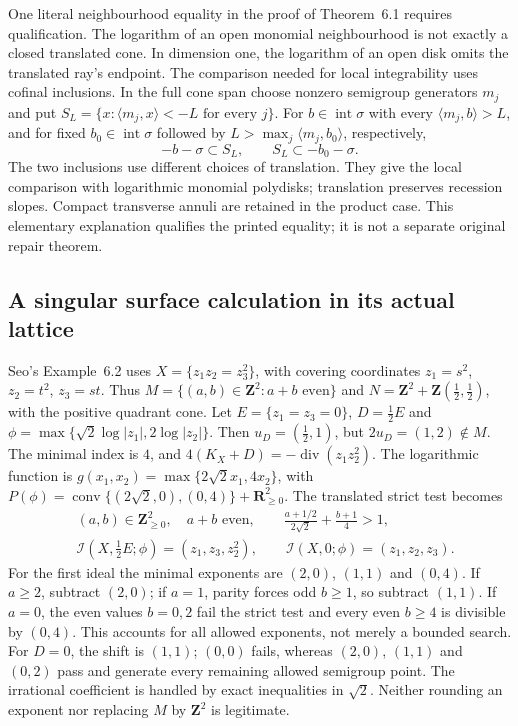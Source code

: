 One literal neighbourhood equality in the proof of Theorem~6.1
requires qualification. The logarithm of an open monomial neighbourhood
is not exactly a closed translated cone. In dimension one, the
logarithm of an open disk omits the translated ray's endpoint.
The comparison needed for local integrability uses cofinal inclusions.
In the full cone span choose nonzero semigroup generators $m_j$ and
put $S_L=\{x:\langle m_j,x\rangle<-L\text{ for every }j\}$.
For $b\in\operatorname{int}\sigma$ with every
$\langle m_j,b\rangle>L$, and for fixed
$b_0\in\operatorname{int}\sigma$ followed by
$L>\max_j\langle m_j,b_0\rangle$, respectively,
\begin{equation*}
 -b-\sigma\subset S_L,
 \qquad S_L\subset-b_0-\sigma.
\tag{H.69}\label{eq:appH-toric-cofinal-tails}
\end{equation*}
The two inclusions use different choices of translation. They give
the local comparison with logarithmic monomial polydisks; translation
preserves recession slopes. Compact transverse annuli are retained
in the product case. This elementary explanation qualifies the
printed equality; it is not a separate original repair theorem.

\subsection{A singular surface calculation in its actual lattice}
\label{sec:appH-toric-A1-calculation}

Seo's Example~6.2 uses $X=\{z_1z_2=z_3^2\}$, with covering
coordinates $z_1=s^2$, $z_2=t^2$, $z_3=st$. Thus
$M=\{(a,b)\in\mathbf Z^2:a+b\text{ even}\}$ and
$N=\mathbf Z^2+\mathbf Z(\tfrac12,\tfrac12)$, with the positive
quadrant cone. Let $E=\{z_1=z_3=0\}$, $D=\tfrac12E$ and
$\phi=\max\{\sqrt2\log|z_1|,2\log|z_2|\}$. Then
$u_D=(\tfrac12,1)$, but $2u_D=(1,2)\notin M$.
The minimal index is $4$, and
$4(K_X+D)=-\operatorname{div}(z_1z_2^2)$.
The logarithmic function is
$g(x_1,x_2)=\max\{2\sqrt2x_1,4x_2\}$, with
$P(\phi)=\operatorname{conv}\{(2\sqrt2,0),(0,4)\}
+\mathbf R_{\geq0}^2$. The translated strict test becomes
\begin{equation*}
\begin{aligned}
 &(a,b)\in\mathbf Z_{\geq0}^2,\quad a+b\text{ even},\qquad
   \frac{a+1/2}{2\sqrt2}+\frac{b+1}{4}>1,\\
 &\mathcal I(X,\tfrac12E;\phi)=(z_1,z_3,z_2^2),\qquad
   \mathcal I(X,0;\phi)=(z_1,z_2,z_3).
\end{aligned}
\tag{H.70}\label{eq:appH-toric-A1-ideals}
\end{equation*}
For the first ideal the minimal exponents are $(2,0)$, $(1,1)$
and $(0,4)$. If $a\geq2$, subtract $(2,0)$; if $a=1$, parity
forces odd $b\geq1$, so subtract $(1,1)$. If $a=0$, the even
values $b=0,2$ fail the strict test and every even $b\geq4$ is
divisible by $(0,4)$. This accounts for all allowed exponents,
not merely a bounded search. For $D=0$, the shift is $(1,1)$;
$(0,0)$ fails, whereas $(2,0)$, $(1,1)$ and $(0,2)$ pass and
generate every remaining allowed semigroup point. The irrational
coefficient is handled by exact inequalities in $\sqrt2$. Neither
rounding an exponent nor replacing $M$ by $\mathbf Z^2$ is legitimate.

